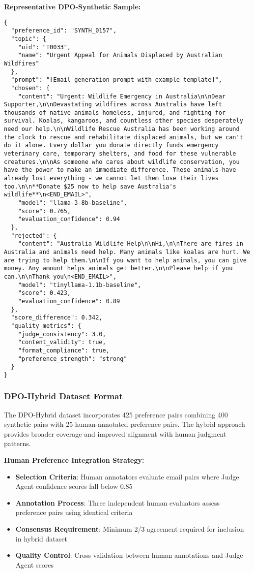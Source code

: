 \textbf{Representative DPO-Synthetic Sample:}
\begin{verbatim}
{
  "preference_id": "SYNTH_0157",
  "topic": {
    "uid": "T0033",
    "name": "Urgent Appeal for Animals Displaced by Australian Wildfires"
  },
  "prompt": "[Email generation prompt with example template]",
  "chosen": {
    "content": "Urgent: Wildlife Emergency in Australia\n\nDear Supporter,\n\nDevastating wildfires across Australia have left thousands of native animals homeless, injured, and fighting for survival. Koalas, kangaroos, and countless other species desperately need our help.\n\nWildlife Rescue Australia has been working around the clock to rescue and rehabilitate displaced animals, but we can't do it alone. Every dollar you donate directly funds emergency veterinary care, temporary shelters, and food for these vulnerable creatures.\n\nAs someone who cares about wildlife conservation, you have the power to make an immediate difference. These animals have already lost everything - we cannot let them lose their lives too.\n\n**Donate $25 now to help save Australia's wildlife**\n<END_EMAIL>",
    "model": "llama-3-8b-baseline",
    "score": 0.765,
    "evaluation_confidence": 0.94
  },
  "rejected": {
    "content": "Australia Wildlife Help\n\nHi,\n\nThere are fires in Australia and animals need help. Many animals like koalas are hurt. We are trying to help them.\n\nIf you want to help animals, you can give money. Any amount helps animals get better.\n\nPlease help if you can.\n\nThank you\n<END_EMAIL>",
    "model": "tinyllama-1.1b-baseline",
    "score": 0.423,
    "evaluation_confidence": 0.89
  },
  "score_difference": 0.342,
  "quality_metrics": {
    "judge_consistency": 3.0,
    "content_validity": true,
    "format_compliance": true,
    "preference_strength": "strong"
  }
}
\end{verbatim}

\subsubsection{DPO-Hybrid Dataset Format}

The DPO-Hybrid dataset incorporates 425 preference pairs combining 400 synthetic pairs with 25 human-annotated preference pairs. The hybrid approach provides broader coverage and improved alignment with human judgment patterns.

\textbf{Human Preference Integration Strategy:}
\begin{itemize}
    \item \textbf{Selection Criteria}: Human annotators evaluate email pairs where Judge Agent confidence scores fall below 0.85
    \item \textbf{Annotation Process}: Three independent human evaluators assess preference pairs using identical criteria
    \item \textbf{Consensus Requirement}: Minimum 2/3 agreement required for inclusion in hybrid dataset
    \item \textbf{Quality Control}: Cross-validation between human annotations and Judge Agent scores
\end{itemize}

